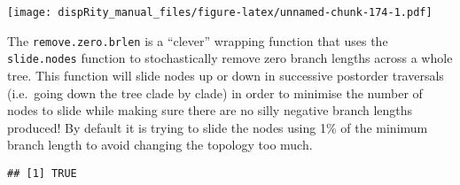\documentclass[
]{book}
\newenvironment{Shaded}{\begin{snugshade}}{\end{snugshade}}
\newcommand{\CommentTok}[1]{\textcolor[rgb]{0.56,0.35,0.01}{\textit{#1}}}
\newcommand{\DataTypeTok}[1]{\textcolor[rgb]{0.13,0.29,0.53}{#1}}
\newcommand{\DecValTok}[1]{\textcolor[rgb]{0.00,0.00,0.81}{#1}}
\newcommand{\KeywordTok}[1]{\textcolor[rgb]{0.13,0.29,0.53}{\textbf{#1}}}
\newcommand{\NormalTok}[1]{#1}
\newcommand{\OperatorTok}[1]{\textcolor[rgb]{0.81,0.36,0.00}{\textbf{#1}}}
\newcommand{\StringTok}[1]{\textcolor[rgb]{0.31,0.60,0.02}{#1}}
\begin{document}
\texttt{[image: dispRity\_manual\_files/figure-latex/unnamed-chunk-174-1.pdf]}

The \texttt{remove.zero.brlen} is a ``clever'' wrapping function that uses the \texttt{slide.nodes} function to stochastically remove zero branch lengths across a whole tree.
This function will slide nodes up or down in successive postorder traversals (i.e.~going down the tree clade by clade) in order to minimise the number of nodes to slide while making sure there are no silly negative branch lengths produced!
By default it is trying to slide the nodes using 1\% of the minimum branch length to avoid changing the topology too much.

\begin{Shaded}
\end{Shaded}

\begin{verbatim}
## [1] TRUE
\end{verbatim}

\begin{Shaded}
\end{Shaded}
\end{document}
